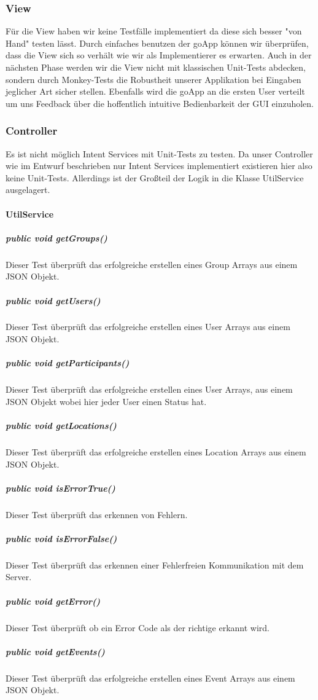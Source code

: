 \documentclass{scrartcl}
\begin{document}
	\subsubsection{View}
	Für die View haben wir keine Testfälle implementiert da diese sich besser "von Hand" testen lässt. Durch einfaches benutzen der goApp können wir überprüfen, dass die View sich so verhält wie wir als Implementierer es erwarten.
Auch in der nächsten Phase werden wir die View nicht mit klassischen Unit-Tests abdecken, sondern durch Monkey-Tests die Robustheit unserer Applikation bei Eingaben jeglicher Art sicher stellen.
Ebenfalls wird die goApp an die ersten User verteilt um uns Feedback über die hoffentlich intuitive Bedienbarkeit der GUI einzuholen.

	\subsubsection{Controller}
	Es ist nicht möglich Intent Services mit Unit-Tests zu testen.  Da unser Controller wie im Entwurf beschrieben nur Intent Services implementiert existieren hier also keine Unit-Tests.
Allerdings ist der Großteil der Logik in die Klasse UtilService ausgelagert. 

	\paragraph{UtilService}
	\subparagraph{public void getGroups()}
	Dieser Test überprüft das erfolgreiche erstellen eines Group Arrays aus einem JSON Objekt.
	\subparagraph{public void getUsers()}
	Dieser Test überprüft das erfolgreiche erstellen eines User Arrays aus einem JSON Objekt.
	\subparagraph{public void getParticipants()}
	Dieser Test überprüft das erfolgreiche erstellen eines User Arrays, aus einem JSON Objekt wobei hier jeder User einen Status hat.
	\subparagraph{public void getLocations()}
	Dieser Test überprüft das erfolgreiche erstellen eines Location Arrays aus einem JSON Objekt.
	\subparagraph{public void isErrorTrue()}
	Dieser Test überprüft das erkennen von Fehlern.
	\subparagraph{public void isErrorFalse()}
	Dieser Test überprüft das erkennen einer Fehlerfreien Kommunikation mit dem Server. 
	\subparagraph{public void getError()}
	Dieser Test überprüft ob ein Error Code als der richtige erkannt wird.
	\subparagraph{public void getEvents()}
	Dieser Test überprüft das erfolgreiche erstellen eines Event Arrays aus einem JSON Objekt.
	
\end{document}
